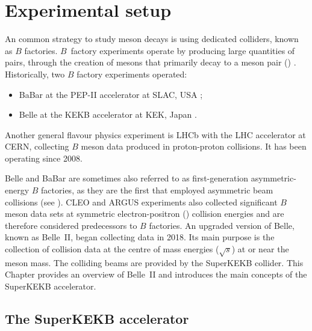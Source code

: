 \chapter{Experimental setup}\label{ch:belle2}

An common strategy to study \B meson decays is using dedicated colliders, known as $B$ factories.
$B$~factory experiments operate by producing large quantities of \BB pairs, through the creation of \FourS mesons that primarily decay to a \B meson pair (\BB) \cite{Workman:2022ynf}.
Historically, two $B$ factory experiments operated:
\begin{itemize}
    \item BaBar at the PEP-II accelerator at SLAC, USA \cite{BaBar:1995bns};
    \item Belle at the KEKB accelerator at KEK, Japan \cite{Belle:2000cnh}.
\end{itemize}
Another general flavour physics experiment is LHCb \cite{LHCb:2008vvz} with the LHC accelerator at CERN, 
collecting $B$ meson data produced in proton-proton collisions.
It has been operating since 2008.

Belle and BaBar are sometimes also referred to as first-generation asymmetric-energy $B$ factories, as they are the first that employed asymmetric beam collisions (see ).
CLEO \cite{CLEO:1982pvq} and ARGUS \cite{ARGUS:1988bds} experiments also collected significant $B$ meson data sets at symmetric electron-positron (\epem) collision energies and are therefore considered predecessors to $B$ factories. 
An upgraded version of Belle, known as Belle~II, began collecting data in 2018.
Its main purpose is the collection of \epem collision data 
at the centre of mass energies ($\sqrt{s}$) at or near the \FourS meson mass.
The colliding beams are provided by the SuperKEKB collider.
This Chapter provides an overview of Belle~II and introduces the main concepts of the SuperKEKB accelerator.

\section{The SuperKEKB accelerator}\label{sec:superkekb}

